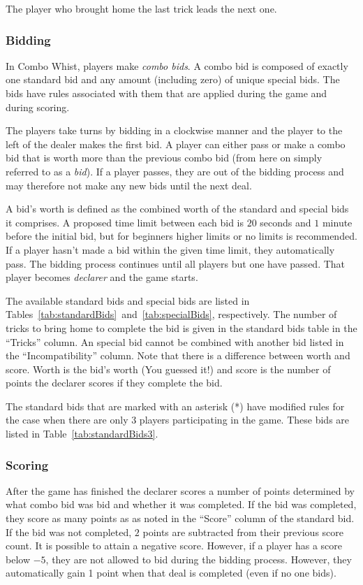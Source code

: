 \documentclass[a4paper]{article}
\begin{document}
{{{				 The player who brought home the last trick leads the next one.
			}

			\subsubsection{Bidding}{\label{sec:bidding}
				In Combo Whist, players make \emph{combo bids}. A combo bid is composed of exactly one standard bid and any amount (including zero) of unique special bids. The bids have rules associated with them that are applied during the game and during scoring.

				The players take turns by bidding in a clockwise manner and the player to the left of the dealer makes the first bid. A player can either pass or make a combo bid that is worth more than the previous combo bid (from here on simply referred to as a \emph{bid}). If a player passes, they are out of the bidding process and may therefore not make any new bids until the next deal.

				A bid's worth is defined as the combined worth of the standard and special bids it comprises. A proposed time limit between each bid is $20$ seconds and $1$ minute before the initial bid, but for beginners higher limits or no limits is recommended. If a player hasn't made a bid within the given time limit, they automatically pass. The bidding process continues until all players but one have passed. That player becomes \emph{declarer} and the game starts.

				The available standard bids and special bids are listed in Tables~\ref{tab:standardBids}~and~\ref{tab:specialBids}, respectively. The number of tricks to bring home to complete the bid is given in the standard bids table in the ``Tricks'' column. An special bid cannot be combined with another bid listed in the ``Incompatibility'' column. Note that there is a difference between worth and score. Worth is the bid's worth (You guessed it!) and score is the number of points the declarer scores if they complete the bid.

				The standard bids that are marked with an asterisk (*) have modified rules for the case when there are only $3$ players participating in the game. These bids are listed in Table~\ref{tab:standardBids3}.

				
				
				\restoregeometry%
			}

			\subsubsection{Scoring}{%
				After the game has finished the declarer scores a number of points determined by what combo bid was bid and whether it was completed. If the bid was completed, they score as many points as as noted in the ``Score'' column of the standard bid. If the bid was not completed, $2$ points are subtracted from their previous score count. It is possible to attain a negative score. However, if a player has a score below $-5$, they are not allowed to bid during the bidding process. However, they automatically gain 1 point when that deal is completed (even if no one bids).
			}

}}
\end{document}
